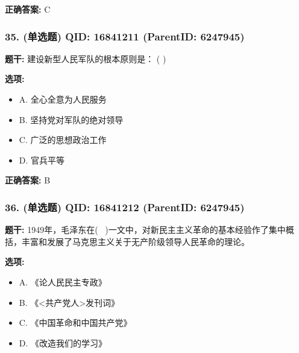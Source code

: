 \documentclass[12pt,UTF8]{ctexart}
\begin{document}
\textbf{正确答案:}
C

\vspace{0.3em}\hrulefill\vspace{0.7em}

\subsubsection*{35. (单选题) \small QID: 16841211 (ParentID: 6247945)}

\textbf{题干:}
建设新型人民军队的根本原则是： ( )



\textbf{选项:}
\begin{itemize}[leftmargin=*]

  \item A. 全心全意为人民服务

  \item B. 坚持党对军队的绝对领导

  \item C. 广泛的思想政治工作

  \item D. 官兵平等

\end{itemize}

\textbf{正确答案:}
B

\vspace{0.3em}\hrulefill\vspace{0.7em}

\subsubsection*{36. (单选题) \small QID: 16841212 (ParentID: 6247945)}

\textbf{题干:}
1949年，毛泽东在(  )一文中，对新民主主义革命的基本经验作了集中概括，丰富和发展了马克思主义关于无产阶级领导人民革命的理论。



\textbf{选项:}
\begin{itemize}[leftmargin=*]

  \item A. 《论人民民主专政》

  \item B. 《<共产党人>发刊词》

  \item C. 《中国革命和中国共产党》

  \item D. 《改造我们的学习》

\end{itemize}
\end{document}
